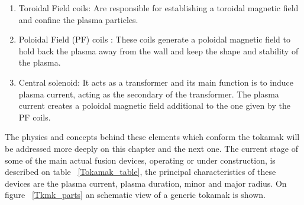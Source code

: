 \begin{enumerate}
	\item Toroidal Field coils: Are responsible for establishing a toroidal magnetic field  and confine the plasma particles.
	\smallskip
	
	\item Poloidal Field (PF) coils : These coils generate a poloidal magnetic field  to hold back the plasma away from the wall and keep the shape and stability of the plasma.\smallskip
	
	\item Central solenoid: It acts as a transformer and its main function is to induce plasma current, acting as the secondary of the transformer. The plasma current creates a poloidal magnetic field additional to the one given by the PF coils. \smallskip
	
\end{enumerate}

The physics and concepts behind these elements which conform the tokamak will be addressed more deeply on this chapter and the next one. The current stage of some of the main actual fusion devices, operating or under construction,  is described on table ~\ref{Tokamak_table}, the principal characteristics of these devices are the plasma current, plasma duration, minor and major radius. On figure ~\ref{Tkmk_parts} an schematic view of a generic tokamak is shown.




